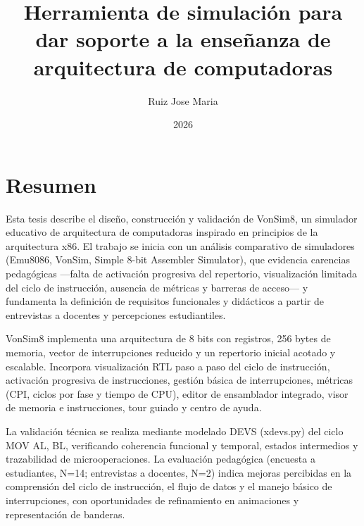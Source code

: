 \documentclass[12pt,oneside]{templates/unerthesis}
\title{Herramienta de simulación para dar soporte a la enseñanza de arquitectura de computadoras}
\author{Ruiz Jose Maria}
\date{2026}
\begin{document}
%
%

  \maketitle

\frontmatter %
\pagestyle{empty} %



  \setcounter{tocdepth}{1}
  \setlength{\parskip}{0pt}
  \tableofcontents

\setlength\parskip{1em plus 0.1em minus 0.2em}

  \listoftables

  \listoffigures



\mainmatter %
\pagestyle{fancyplain} %

\hypertarget{resumen}{%
\chapter*{Resumen}\label{resumen}}

Esta tesis describe el diseño, construcción y validación de VonSim8, un simulador educativo de arquitectura de computadoras inspirado en principios de la arquitectura x86. El trabajo se inicia con un análisis comparativo de simuladores (Emu8086, VonSim, Simple 8-bit Assembler Simulator), que evidencia carencias pedagógicas ---falta de activación progresiva del repertorio, visualización limitada del ciclo de instrucción, ausencia de métricas y barreras de acceso--- y fundamenta la definición de requisitos funcionales y didácticos a partir de entrevistas a docentes y percepciones estudiantiles.

VonSim8 implementa una arquitectura de 8 bits con registros, 256 bytes de memoria, vector de interrupciones reducido y un repertorio inicial acotado y escalable. Incorpora visualización RTL paso a paso del ciclo de instrucción, activación progresiva de instrucciones, gestión básica de interrupciones, métricas (CPI, ciclos por fase y tiempo de CPU), editor de ensamblador integrado, visor de memoria e instrucciones, tour guiado y centro de ayuda.

La validación técnica se realiza mediante modelado DEVS (xdevs.py) del ciclo MOV AL, BL, verificando coherencia funcional y temporal, estados intermedios y trazabilidad de microoperaciones. La evaluación pedagógica (encuesta a estudiantes, N=14; entrevistas a docentes, N=2) indica mejoras percibidas en la comprensión del ciclo de instrucción, el flujo de datos y el manejo básico de interrupciones, con oportunidades de refinamiento en animaciones y representación de banderas.
\end{document}
